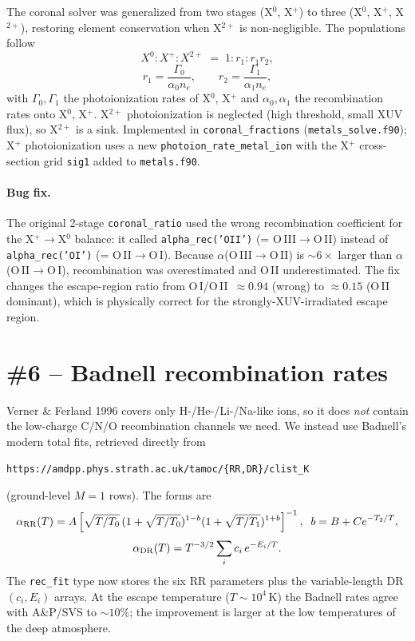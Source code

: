 \documentclass[english,a4paper]{my_memo}
\begin{document}
The coronal solver was generalized from two stages (X$^0$, X$^+$) to
three (X$^0$, X$^+$, X$^{2+}$), restoring element conservation when
X$^{2+}$ is non-negligible.  The populations follow
\[
  X^0 : X^+ : X^{2+} \;=\; 1 : r_1 : r_1 r_2,
\]
\[
  r_1 = \frac{\Gamma_0}{\alpha_0 n_e},\qquad
  r_2 = \frac{\Gamma_1}{\alpha_1 n_e},
\]
with $\Gamma_0,\Gamma_1$ the photoionization rates of X$^0$, X$^+$ and
$\alpha_0,\alpha_1$ the recombination rates onto X$^0$, X$^+$.
X$^{2+}$ photoionization is neglected (high threshold, small XUV flux),
so X$^{2+}$ is a sink.  Implemented in \texttt{coronal\_fractions}
(\texttt{metals\_solve.f90}); X$^+$ photoionization uses a new
\texttt{photoion\_rate\_metal\_ion} with the X$^+$ cross-section grid
\texttt{sig1} added to \texttt{metals.f90}.

\paragraph{Bug fix.}  The original 2-stage \texttt{coronal\_ratio} used
the wrong recombination coefficient for the X$^+\!\to$X$^0$ balance:
it called \texttt{alpha\_rec('OII')} (= O\,III$\to$O\,II) instead of
\texttt{alpha\_rec('OI')} (= O\,II$\to$O\,I).  Because $\alpha$(O\,III$\to$O\,II)
is $\sim 6\times$ larger than $\alpha$(O\,II$\to$O\,I), recombination was
overestimated and O\,II underestimated.  The fix changes the escape-region
ratio from O\,I/O\,II~$\approx 0.94$ (wrong) to $\approx 0.15$ (O\,II
dominant), which is physically correct for the strongly-XUV-irradiated
escape region.

\section{\#6 -- Badnell recombination rates}

Verner \& Ferland 1996 covers only H-/He-/Li-/Na-like ions, so it does
\emph{not} contain the low-charge C/N/O recombination channels we need.
We instead use Badnell's modern total fits, retrieved directly from
\begin{center}
\texttt{https://amdpp.phys.strath.ac.uk/tamoc/\{RR,DR\}/clist\_K}
\end{center}
(ground-level $M=1$ rows). The forms are
\[
  \alpha_{\rm RR}(T) = A\left[\sqrt{T/T_0}\,(1+\sqrt{T/T_0})^{1-b}
                       (1+\sqrt{T/T_1})^{1+b}\right]^{-1},
  \;\; b = B + C e^{-T_2/T},
\]
\[
  \alpha_{\rm DR}(T) = T^{-3/2}\sum_i c_i\, e^{-E_i/T}.
\]
The \texttt{rec\_fit} type now stores the six RR parameters plus the
variable-length DR $(c_i, E_i)$ arrays. At the escape temperature
($T\sim10^4$\,K) the Badnell rates agree with A\&P/SVS to $\sim10\%$;
the improvement is larger at the low temperatures of the deep atmosphere.
\end{document}
